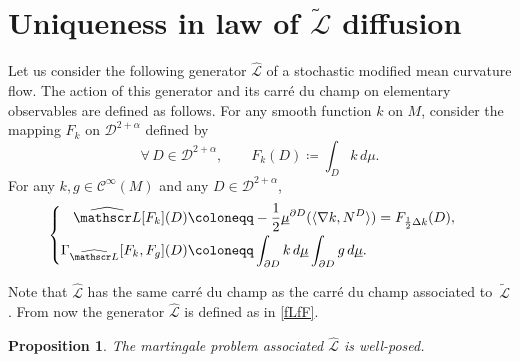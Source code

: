 \documentclass[JEP,XML,SOM,Unicode,NoFloatCountersInSection,published]{cedram}
\theoremstyle{plain}
\newtheorem{prop}[thm]{Proposition}
\theoremstyle{definition}
\newcommand{\SL}{{\mathscr L}}
\newcommand\df{\coloneqq}
\newcommand{\bq}{\begin{equation*}}
\newcommand{\bqq}[1]{\begin{equation}}
\newcommand{\eq}{\end{equation*}}
\newcommand{\eqn}{\end{equation}}
\newcommand{\fo}{\forall\,}
\newcommand{\usm}{{\underline{\smash{\mu}}}}
\let\f\frac
\let\D\Delta
\let\n\nabla
\let\pa\partial
\let\wi\widetilde
\let\iy\infty
\newcommand{\cC}{\mathcal{C}}
\newcommand{\cD}{\mathcal{D}}
\begin{document}
\section{Uniqueness in law of \texorpdfstring{$\tilde{\mathcal{L}}$}{L} diffusion}\label{AppendixG}

Let us consider the following generator $\widehat{\SL}$ of a stochastic modified mean curvature flow. The action of this generator and its carré du champ on elementary observables are defined as follows.
For any smooth function $k$ on $M$, consider the mapping $F_k$ on $\cD^{2+\alpha}$ defined by
\bq
\fo D\in \cD^{2+\alpha},\qquad F_k(D)\df \int_D k\, d\mu.\eq
For any $k,g\in \cC^\iy(M)$ and any $D\in \cD^{2+\alpha}$,
\bqq{G.6.7}
\begin{cases}
\begin{aligned}
\widehat{\SL}[F_k](D)&\df -\f12 \usm^{\partial D}(\langle \n k, N^D\rangle )= F_{\frac12 \D k} (D),\\
\Gamma_{\widehat{\SL}}[F_k, F_g](D)&\df \int_{\pa D} k\, d\usm\int_{\pa D} g\, d\usm.
\end{aligned}
\end{cases}
\eqn\par
Note that $\widehat{\SL} $ has the same carré du champ as the carré du champ associated to~$\wi\SL $.
From now the generator $\widehat{\SL} $ is defined as in \eqref{fLfF}.
\begin{prop}\label{prop-G1} The martingale problem associated $\widehat{\SL}$ is well-posed.
\end{prop}
\end{document}
